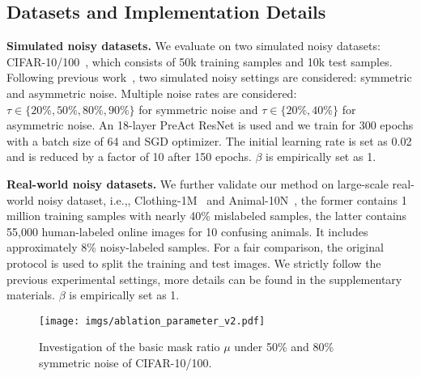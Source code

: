 \documentclass[10pt,twocolumn,letterpaper]{article}
\begin{document}
\subsection{Datasets and Implementation Details}
\textbf{Simulated noisy datasets.} We evaluate on two simulated noisy datasets: CIFAR-10/100~\cite{datasetcifar10}, which consists of 50k training samples and 10k test samples. Following previous work~\cite{li2020dividemix}, two simulated noisy settings are considered: symmetric and asymmetric noise. 
Multiple noise rates are considered: $\tau \in \{20\%, 50\%, 80\%, 90\%\}$ for symmetric noise and $\tau \in \{20\%, 40\%\}$ for asymmetric noise. An 18-layer PreAct ResNet is used and we train for 300 epochs with a batch size of 64 and SGD optimizer. The initial learning rate is set as 0.02 and is reduced by a factor of 10 after 150 epochs. $\beta$ is empirically set as 1.
\iffalse All the hyper-parameters of DivideMix~\cite{li2020dividemix} and C2D~\cite{zheltonozhskii2022contrast} are set as the authors suggested. \fi

\textbf{Real-world noisy datasets.} We further validate our method on large-scale real-world noisy dataset, i.e.,, Clothing-1M~\cite{Clothing1M} and Animal-10N~\cite{animal_SELFIE}, the former contains 1 million training samples with nearly 40\% mislabeled samples, the latter contains 55,000 human-labeled online images for 10 confusing animals. It includes approximately 8\% noisy-labeled samples.
For a fair comparison, the original protocol is used to split the training and test images. We strictly follow the previous experimental settings, more details can be found in the supplementary materials. $\beta$ is empirically set as 1.


\begin{figure*}[!t]
 \centering
\small
 \begin{minipage}{0.9\textwidth}
    \centering
    \texttt{[image: imgs/ablation\_parameter\_v2.pdf]}
\end{minipage}
 \vspace{-1em}
  \caption
    {
    \small
        Investigation of the basic mask ratio $\mu$ under 50\% and 80\% symmetric noise of CIFAR-10/100.
      }
  \label{fig:ablation_parameter}
 \vspace{-2mm}
 \end{figure*}
\end{document}
